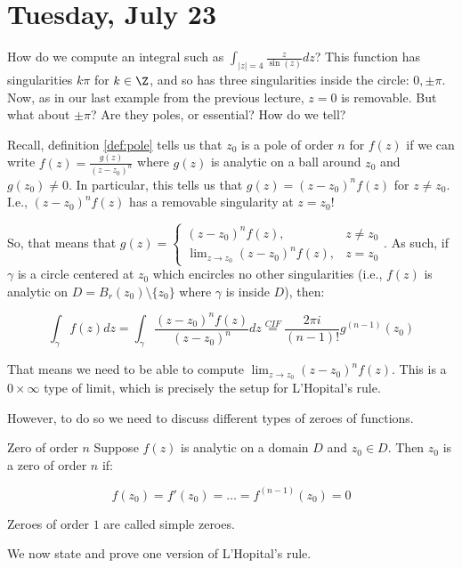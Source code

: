 \section{Tuesday, July 23}


How do we compute an integral such as $\int_{|z| = 4} \frac{z}{\sin(z)}dz$? This function has singularities $k\pi$ for $k\in \Z$, and so has three singularities inside the circle: $0, \pm \pi$. Now, as in our last example from the previous lecture, $z = 0$ is removable. But what about $\pm \pi$? Are they poles, or essential? How do we tell?

Recall, definition \ref{def:pole} tells us that $z_0$ is a pole of order $n$ for $f(z)$ if we can write $f(z) = \frac{g(z)}{(z-z_0)^n}$ where $g(z)$ is analytic on a ball around $z_0$ and $g(z_0) \ne 0$. In particular, this tells us that $g(z) = (z-z_0)^nf(z)$ for $z \ne z_0$. I.e., $(z-z_0)^nf(z)$ has a removable singularity at $z = z_0$!

So, that means that $g(z) = \begin{cases} (z-z_0)^nf(z), &z\ne z_0\\ \lim_{z\rightarrow z_0} (z-z_0)^nf(z), &z = z_0\end{cases}$. As such, if $\gamma$ is a circle centered at $z_0$ which encircles no other singularities (i.e., $f(z)$ is analytic on $D = B_r(z_0)\setminus\{z_0\}$ where $\gamma$ is inside $D$), then:

$$\int_{\gamma} f(z)dz = \int_{\gamma} \frac{(z-z_0)^nf(z)}{(z-z_0)^n}dz \stackrel{CIF}{=} \frac{2\pi i}{(n-1)!}g^{(n-1)}(z_0)$$

That means we need to be able to compute $\lim_{z\rightarrow z_0} (z-z_0)^nf(z)$. This is a $0\times \infty$ type of limit, which is precisely the setup for L'Hopital's rule. 

However, to do so we need to discuss different types of zeroes of functions.

\begin{defbo}{Zero of order $n$}{}
Suppose $f(z)$ is analytic on a domain $D$ and $z_0\in D$. Then $z_0$ is a zero of order $n$ if:

$$f(z_0) = f'(z_0) = \dots = f^{(n-1)}(z_0) = 0$$

Zeroes of order $1$ are called simple zeroes.
\end{defbo}

We now state and prove one version of L'Hopital's rule.

